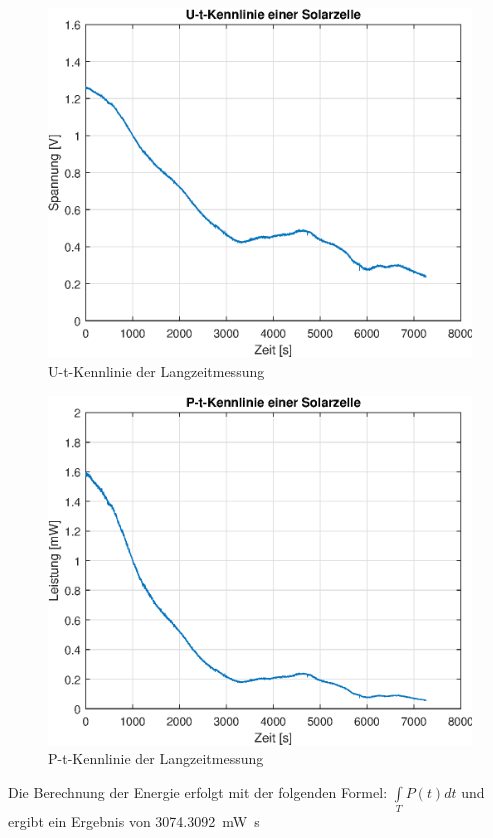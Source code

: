 \clearpage
\begin{figure}[htb]
\centering
\includegraphics[width=12cm]{pictures/U-t/U-t-Kennlinie.eps}
\caption{U-t-Kennlinie der Langzeitmessung}
\label{fig:U-t-Kennlinie Langzeitmessung}
\end{figure}

\begin{figure}[htb]
\centering
\includegraphics[width=12cm]{pictures/U-t/P-t-Kennlinie.eps}
\caption{P-t-Kennlinie der Langzeitmessung}
\label{fig:P-t-Kennlinie Langzeitmessung}
\end{figure}

\clearpage
Die Berechnung der Energie erfolgt mit der folgenden Formel: $\int\limits _T P(t)dt$ und ergibt ein Ergebnis von \SI{3074.3092}{\milli\watt\second}

